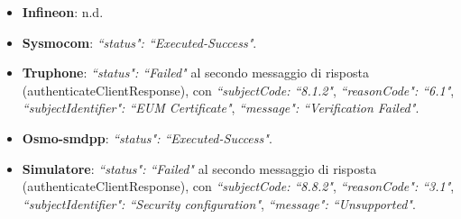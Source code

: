 \documentclass[10pt, oneside]{book}
\begin{document}
\begin{itemize}
\item \textbf{Infineon}: n.d.
\item \textbf{Sysmocom}: \textit{``status": ``Executed-Success"}.
\item \textbf{Truphone}: \textit{``status": ``Failed"} al secondo messaggio di risposta (authenticateClientResponse), con \textit{``subjectCode: ``8.1.2"}, \textit{``reasonCode": ``6.1"}, \textit{``subjectIdentifier": ``EUM Certificate"}, \textit{``message": ``Verification Failed"}.
\item \textbf{Osmo-smdpp}: \textit{``status": ``Executed-Success"}.
\item \textbf{Simulatore}: \textit{``status": ``Failed"} al secondo messaggio di risposta (authenticateClientResponse), con \textit{``subjectCode: ``8.8.2"}, \textit{``reasonCode": ``3.1"}, \textit{``subjectIdentifier": ``Security configuration"}, \textit{``message": ``Unsupported"}.
\end{itemize}
\end{document}
